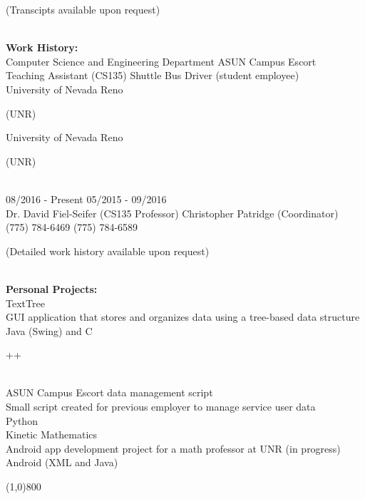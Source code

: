 \documentclass[8pt]{paper}
\begin{document}
\begin{flushleft}
\begin{small}(Transcipts available upon request)\end{small}\\
[2mm]

\large{\bfseries{Work History:}}\\
[2mm]

Computer Science and Engineering Department \hspace{24mm} ASUN Campus Escort\\
Teaching Assistant (CS135) \hspace{60.5mm} Shuttle Bus Driver (student employee)\\
University of Nevada Reno \begin{small}(UNR)
\end{small} \hspace{49.5mm} University of Nevada Reno \begin{small}(UNR)\end{small}\\
08/2016 - Present \hspace{78.5mm} 05/2015 - 09/2016\\
Dr. David Fiel-Seifer (CS135 Professor) \hspace{38.5mm} Christopher Patridge (Coordinator)\\
(775) 784-6469 \hspace{84mm} (775) 784-6589\\

\begin{small}(Detailed work history available upon request)\end{small}\\
[2mm]

\large{\bfseries{Personal Projects:}}\\
[2mm]

TextTree\\
GUI application that stores and organizes data using a tree-based data structure\\
Java (Swing) and C\begin{small}++\end{small}\\
[2mm]

ASUN Campus Escort data management script\\
Small script created for previous employer to manage service user data\\
Python\\
[2mm]

Kinetic Mathematics\\
Android app development project for a math professor at UNR (in progress)\\
Android (XML and Java)\\
[2mm]


\end{flushleft}

\line(1,0){800}\\
\end{document}
